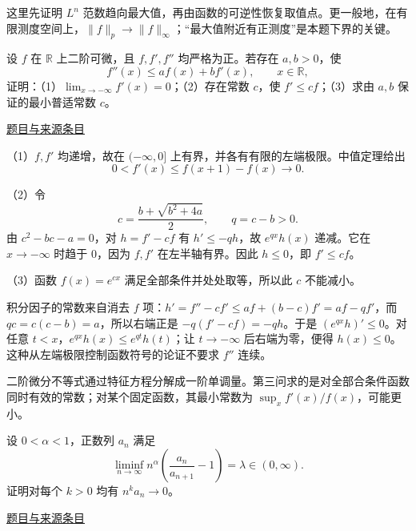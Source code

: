 \documentclass[UTF8,12pt,a4paper,fontset=fandol]{ctexart}
\begin{document}
\begin{remark}[方法与条件]这里先证明 $L^n$ 范数趋向最大值，再由函数的可逆性恢复取值点。更一般地，在有限测度空间上，$\|f\|_p\to\|f\|_\infty$；“最大值附近有正测度”是本题下界的关键。\end{remark}

\begin{example}[来源序号4]\label{ex:pre06-math:4}\label{pr:pre06-math:4}

设 $f$ 在 $\mathbb R$ 上二阶可微，且 $f,f',f''$ 均严格为正。若存在 $a,b>0$，使
\[
f''(x)\le af(x)+bf'(x),\qquad x\in\mathbb R,
\]
证明：（1）$\lim_{x\to-\infty}f'(x)=0$；（2）存在常数 $c$，使 $f'\le cf$；（3）求由 $a,b$ 保证的最小普适常数 $c$。

\par\href{https://github.com/lzxcr/cmc-mathematics/blob/64916fa1fdbc3e444a652eca204d5669058ee321/src/problems/preliminary/06/04.md}{题目与来源条目}

\end{example}

\begin{solve}\label{ans:pre06-math:4}

（1）$f,f'$ 均递增，故在 $(-\infty,0]$ 上有界，并各有有限的左端极限。中值定理给出
\[
0<f'(x)\le f(x+1)-f(x)\longrightarrow0.
\]

（2）令
\[
c=\frac{b+\sqrt{b^2+4a}}2,\qquad q=c-b>0.
\]
由 $c^2-bc-a=0$，对 $h=f'-cf$ 有 $h'\le-qh$，故 $e^{qx}h(x)$ 递减。它在 $x\to-\infty$ 时趋于 $0$，因为 $f,f'$ 在左半轴有界。因此 $h\le0$，即 $f'\le cf$。

（3）函数 $f(x)=e^{cx}$ 满足全部条件并处处取等，所以此 $c$ 不能减小。

积分因子的常数来自消去 $f$ 项：$h'=f''-cf'\le af+(b-c)f'=af-qf'$，而 $qc=c(c-b)=a$，所以右端正是 $-q(f'-cf)=-qh$。于是 $(e^{qx}h)'\le0$。对任意 $t<x$，$e^{qx}h(x)\le e^{qt}h(t)$；让 $t\to-\infty$ 后右端为零，便得 $h(x)\le0$。这种从左端极限控制函数符号的论证不要求 $f''$ 连续。

\end{solve}

\begin{remark}[方法与条件]二阶微分不等式通过特征方程分解成一阶单调量。第三问求的是对全部合条件函数同时有效的常数；对某个固定函数，其最小常数为 $\sup_x f'(x)/f(x)$，可能更小。\end{remark}

\begin{example}[来源序号6]\label{ex:pre06-math:6}\label{pr:pre06-math:6}

设 $0<\alpha<1$，正数列 $a_n$ 满足
\[
\liminf_{n\to\infty}n^\alpha\left(\frac{a_n}{a_{n+1}}-1\right)
=\lambda\in(0,\infty).
\]
证明对每个 $k>0$ 均有 $n^ka_n\to0$。

\par\href{https://github.com/lzxcr/cmc-mathematics/blob/64916fa1fdbc3e444a652eca204d5669058ee321/src/problems/preliminary/06/06.md}{题目与来源条目}

\end{example}
\end{document}
